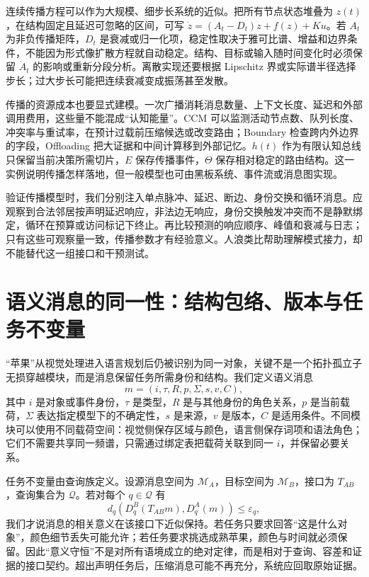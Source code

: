 连续传播方程可以作为大规模、细步长系统的近似。把所有节点状态堆叠为 $z(t)$，在结构固定且延迟可忽略的区间，可写 $\dot z=(A_t-D_t)z+f(z)+Ku$。若 $A_t$ 为非负传播矩阵，$D_t$ 是衰减或归一化项，稳定性取决于雅可比谱、增益和边界条件，不能因为形式像扩散方程就自动稳定。结构、目标或输入随时间变化时必须保留 $\dot A_t$ 的影响或重新分段分析。离散实现还要根据 Lipschitz 界或实际谱半径选择步长；过大步长可能把连续衰减变成振荡甚至发散。

传播的资源成本也要显式建模。一次广播消耗消息数量、上下文长度、延迟和外部调用费用，这些量不能混成“认知能量”。CCM 可以监测活动节点数、队列长度、冲突率与重试率，在预计过载前压缩候选或改变路由；Boundary 检查跨内外边界的字段，Offloading 把大证据和中间计算移到外部记忆。$h(t)$ 作为有限认知总线只保留当前决策所需切片，$E$ 保存传播事件，$\Theta$ 保存相对稳定的路由结构。这一实例说明传播怎样落地，但一般模型也可由黑板系统、事件流或消息图实现。

验证传播模型时，我们分别注入单点脉冲、延迟、断边、身份交换和循环消息。应观察到合法邻居按声明延迟响应，非法边无响应，身份交换触发冲突而不是静默绑定，循环在预算或访问标记下终止。再比较预测的响应顺序、峰值和衰减与日志；只有这些可观察量一致，传播参数才有经验意义。人浪类比帮助理解模式接力，却不能替代这一组接口和干预测试。

\section{语义消息的同一性：结构包络、版本与任务不变量}
\label{sec:semantion_invariance}

“苹果”从视觉处理进入语言规划后仍被识别为同一对象，关键不是一个拓扑孤立子无损穿越模块，而是消息保留任务所需身份和结构。我们定义语义消息
\begin{equation}
m=(i,\tau,R,p,\Sigma,s,v,C),
\end{equation}
其中 $i$ 是对象或事件身份，$\tau$ 是类型，$R$ 是与其他身份的角色关系，$p$ 是当前载荷，$\Sigma$ 表达指定模型下的不确定性，$s$ 是来源，$v$ 是版本，$C$ 是适用条件。不同模块可以使用不同载荷空间：视觉侧保存区域与颜色，语言侧保存词项和语法角色；它们不需要共享同一频谱，只需通过绑定表把载荷关联到同一 $i$，并保留必要关系。

任务不变量由查询族定义。设源消息空间为 $\mathcal{M}_A$，目标空间为 $\mathcal{M}_B$，接口为 $T_{AB}$，查询集合为 $\mathcal{Q}$。若对每个 $q\in\mathcal{Q}$ 有
\begin{equation}
d_q\!\left(D_q^B(T_{AB}m),D_q^A(m)\right)\leq\varepsilon_q,
\end{equation}
我们才说消息的相关意义在该接口下近似保持。若任务只要求回答“这是什么对象”，颜色细节丢失可能允许；若任务要求挑选成熟苹果，颜色与时间就必须保留。因此“意义守恒”不是对所有语境成立的绝对定律，而是相对于查询、容差和证据的接口契约。超出声明任务后，压缩消息可能不再充分，系统应回取原始证据。

